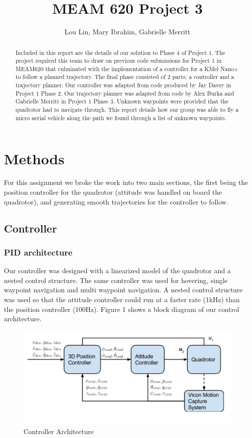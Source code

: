 \documentclass[english, twocolumn]{article}
\title{MEAM 620 Project 3}
\author{Lou Lin, Mary Ibrahim, Gabrielle Merritt}
\begin{document}
\maketitle

\begin{abstract}
Included in this report are the details of our solution to Phase 4 of Project 1. The project required this team to draw on previous code submissions for Project 1 in MEAM620 that culminated with the implementation of a controller for a KMel Nano+ to follow a planned trajectory. The final phase consisted of 2 parts; a controller and a trajectory planner.  Our controller was adapted from code produced by Jay Davey in Project 1 Phase 2.  Our trajectory planner was adapted from code by Alex Burka and Gabrielle Merritt in Project 1 Phase 3.  Unknown waypoints were provided that the quadrotor had to navigate through.  This report details how our group was able to fly a micro aerial vehicle along the path we found through a list of unknown waypoints. 
\end{abstract}

\section*{Methods}
For this assignment we broke the work into two main sections, the first being the position controller for the quadrotor (attitude was handled on board the quadrotor), and generating smooth trajectories for the controller to follow. 
\subsection*{Controller}
\subsubsection*{PID architecture}

Our controller was designed with a linearized model of the quadrotor and a nested control structure.  The same controller was used for hovering, single waypoint navigation and multi waypoint navigation. A nested control structure was used so that the attitude controller could run at a faster rate (1kHz) than the position controller (100Hz).  Figure 1 shows a block diagram of our control architecture.
\nolinebreak
\begin{figure}[!h]
\caption{Controller Architecture}
\includegraphics[width = \linewidth]{PID.png}
\end{figure}
\FloatBarrier
\end{document}
